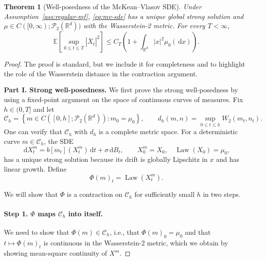 \documentclass[11pt]{amsart}
\numberwithin{equation}{section}
\theoremstyle{plain}
\newtheorem{theorem}{Theorem}[section]
\newcommand{\R}{\mathbb{R}}
\newcommand{\E}{\mathbb{E}}
\newcommand{\cP}{\mathcal{P}}
\newcommand{\dd}{\,\mathrm{d}}
\newcommand{\abs}[1]{\left\lvert#1\right\rvert}
\DeclareMathOperator{\Law}{Law}
\begin{document}
\begin{theorem}[Well-posedness of the McKean--Vlasov SDE]
\label{thm:mv-wellposed}
Under Assumption~\ref{ass:regular-mf}, \eqref{eq:mv-sde} has a unique global
strong solution and $\mu\in C([0,\infty);\cP_2(\R^d))$ with the Wasserstein-2 metric.  For every $T<\infty$,
\begin{equation}\label{eq:mv-moment}
 \E\left[\sup_{0\leq t\leq T}\abs{\overline X_t}^2\right]
 \leq C_T\left(1+\int_{\R^d}\abs{x}^2\mu_0(\dd x)\right).
\end{equation}
\end{theorem}
\begin{proof}   The proof is standard, but we include it for completeness and to highlight the role of the Wasserstein distance in the contraction argument. 

\textbf{Part I. Strong well-posedness.}  We first prove the strong well-posedness by using a fixed-point argument on the space of continuous curves of measures. 
Fix $h\in (0,T]$ and let
\[
 \mathcal C_h=\left\{m\in C([0,h];\cP_2(\R^d)):m_0=\mu_0\right\},
 \qquad d_h(m,n)=\sup_{0\leq t\leq h}W_2(m_t,n_t).
\]
One can verify that $\mathcal C_h$ with $d_h$ is a complete metric space.  For a deterministic curve $m\in\mathcal
C_h$, the SDE
\begin{equation}\label{eq:frozen-law-sde}
 \dd X_t^m=b[m_t](X_t^m)\dd t+\sigma\dd B_t,
 \qquad X_0^m=X_0,\quad\Law(X_0)=\mu_0,
\end{equation}
has a unique strong solution because its drift is globally Lipschitz in $x$
and has linear growth.  Define
$$\Phi(m)_t=\Law(X_t^m).$$  

We will show that $\Phi$ is a contraction on $\mathcal C_h$ for sufficiently small $h$ in two steps. 

\paragraph{\textbf{Step 1. $\Phi$ maps $\mathcal C_h$ into itself.}}  We need to show that $\Phi(m)\in\mathcal C_h$, i.e., that $\Phi(m)_0=\mu_0$ and that $t\mapsto \Phi(m)_t$ is continuous in the Wasserstein-2 metric, which we obtain by showing mean-square continuity of $X^m$. 


\end{proof}
\end{document}
